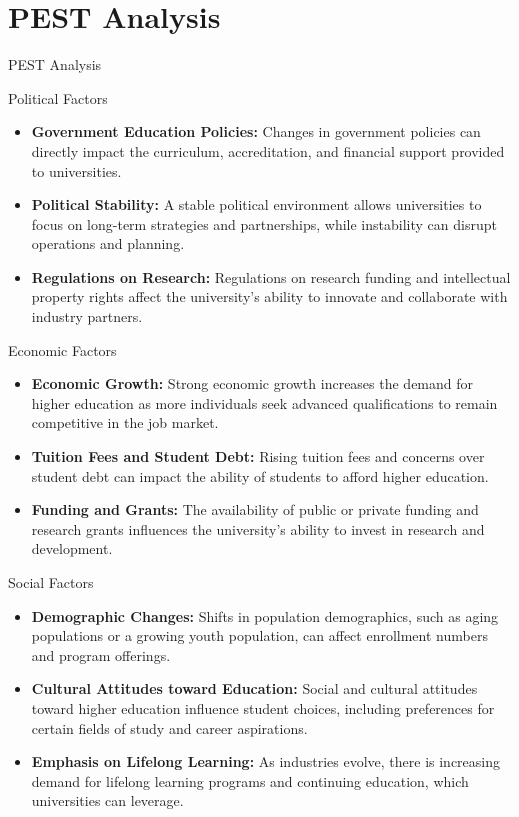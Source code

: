 \documentclass[aspectratio=169, table]{beamer}
\begin{document}
\section{PEST Analysis}

\begin{frame}
	\centering
	\Huge PEST Analysis
\end{frame}

\begin{frame}{Political Factors}
	\begin{itemize}
		\item \textbf{Government Education Policies:} Changes in government policies can directly impact the curriculum, accreditation, and financial support provided to universities.
		\item \textbf{Political Stability:} A stable political environment allows universities to focus on long-term strategies and partnerships, while instability can disrupt operations and planning.
		\item \textbf{Regulations on Research:} Regulations on research funding and intellectual property rights affect the university's ability to innovate and collaborate with industry partners.
	\end{itemize}
\end{frame}

\begin{frame}{Economic Factors}
	\begin{itemize}
		\item \textbf{Economic Growth:} Strong economic growth increases the demand for higher education as more individuals seek advanced qualifications to remain competitive in the job market.
		\item \textbf{Tuition Fees and Student Debt:} Rising tuition fees and concerns over student debt can impact the ability of students to afford higher education.
		\item \textbf{Funding and Grants:} The availability of public or private funding and research grants influences the university’s ability to invest in research and development.
	\end{itemize}
\end{frame}

\begin{frame}{Social Factors}
	\begin{itemize}
		\item \textbf{Demographic Changes:} Shifts in population demographics, such as aging populations or a growing youth population, can affect enrollment numbers and program offerings.
		\item \textbf{Cultural Attitudes toward Education:} Social and cultural attitudes toward higher education influence student choices, including preferences for certain fields of study and career aspirations.
		\item \textbf{Emphasis on Lifelong Learning:} As industries evolve, there is increasing demand for lifelong learning programs and continuing education, which universities can leverage.
	\end{itemize}
\end{frame}
\end{document}

